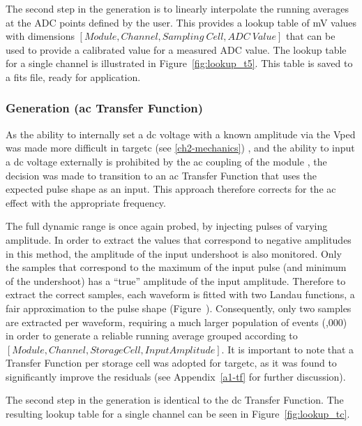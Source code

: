 The second step in the generation is to linearly interpolate the running averages at the ADC points defined by the user. This provides a lookup table of mV values with dimensions $[Module, Channel, Sampling~Cell, ADC~Value]$ that can be used to provide a calibrated value for a measured ADC value. The lookup table for a single channel is illustrated in Figure~\ref{fig:lookup_t5}. This table is saved to a \gls{fits} file, ready for application.

\subsubsection{Generation (\gls{ac} Transfer Function)}

As the ability to internally set a \gls{dc} voltage with a known amplitude via the Vped was made more difficult in \gls{targetc} (see \ref{ch2-mechanics}) , and the ability to input a \gls{dc} voltage externally is prohibited by the \gls{ac} coupling of the module , the decision was made to transition to an \gls{ac} Transfer Function that uses the expected pulse shape as an input. This approach therefore corrects for the \gls{ac} effect with the appropriate frequency. 
	
The full dynamic range is once again probed, by injecting pulses of varying amplitude. In order to extract the values that correspond to negative amplitudes in this method, the amplitude of the input undershoot is also monitored. Only the samples that correspond to the maximum of the input pulse (and minimum of the undershoot) has a ``true'' amplitude of the input amplitude. Therefore to extract the correct samples, each waveform is fitted with two Landau functions, a fair approximation to the pulse shape (Figure~). Consequently, only two samples are extracted per waveform, requiring a much larger population of events (,000) in order to generate a reliable running average grouped according to $[Module, Channel, Storage Cell, Input Amplitude]$. It is important to note that a Transfer Function per storage cell was adopted for \gls{targetc}, as it was found to significantly improve the residuals (see Appendix~\ref{a1-tf} for further discussion).

The second step in the generation is identical to the \gls{dc} Transfer Function. The resulting lookup table for a single channel can be seen in Figure~\ref{fig:lookup_tc}.

